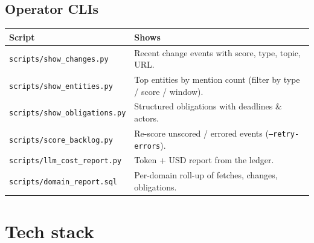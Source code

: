 \documentclass[11pt,a4paper]{article}
\begin{document}
\subsection{Operator CLIs}

\begin{center}
\small
\begin{tabularx}{\linewidth}{@{}lX@{}}
\toprule
\textbf{Script} & \textbf{Shows} \\
\midrule
\texttt{scripts/show\_changes.py}     & Recent change events with score, type, topic, URL. \\
\texttt{scripts/show\_entities.py}    & Top entities by mention count (filter by type / score / window). \\
\texttt{scripts/show\_obligations.py} & Structured obligations with deadlines \& actors. \\
\texttt{scripts/score\_backlog.py}    & Re-score unscored / errored events (\texttt{--retry-errors}). \\
\texttt{scripts/llm\_cost\_report.py} & Token + USD report from the ledger. \\
\texttt{scripts/domain\_report.sql}   & Per-domain roll-up of fetches, changes, obligations. \\
\bottomrule
\end{tabularx}
\end{center}

\section{Tech stack}
\end{document}
